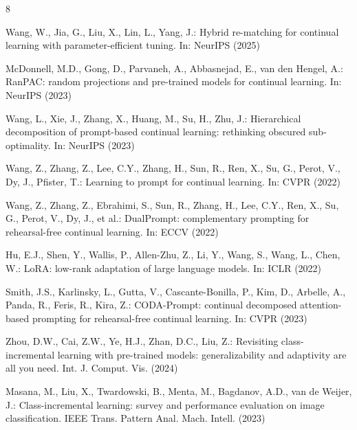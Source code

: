 \documentclass[runningheads]{llncs}
\begin{document}
\begin{thebibliography}{8}

Wang, W., Jia, G., Liu, X., Lin, L., Yang, J.: Hybrid re-matching for continual
learning with parameter-efficient tuning. In: NeurIPS (2025)

McDonnell, M.D., Gong, D., Parvaneh, A., Abbasnejad, E., van den Hengel, A.:
RanPAC: random projections and pre-trained models for continual learning. In:
NeurIPS (2023)

Wang, L., Xie, J., Zhang, X., Huang, M., Su, H., Zhu, J.: Hierarchical
decomposition of prompt-based continual learning: rethinking obscured
sub-optimality. In: NeurIPS (2023)

Wang, Z., Zhang, Z., Lee, C.Y., Zhang, H., Sun, R., Ren, X., Su, G., Perot, V.,
Dy, J., Pfister, T.: Learning to prompt for continual learning. In: CVPR (2022)

Wang, Z., Zhang, Z., Ebrahimi, S., Sun, R., Zhang, H., Lee, C.Y., Ren, X., Su,
G., Perot, V., Dy, J., et al.: DualPrompt: complementary prompting for
rehearsal-free continual learning. In: ECCV (2022)

Hu, E.J., Shen, Y., Wallis, P., Allen-Zhu, Z., Li, Y., Wang, S., Wang, L., Chen,
W.: LoRA: low-rank adaptation of large language models. In: ICLR (2022)

%

Smith, J.S., Karlinsky, L., Gutta, V., Cascante-Bonilla, P., Kim, D., Arbelle,
A., Panda, R., Feris, R., Kira, Z.: CODA-Prompt: continual decomposed
attention-based prompting for rehearsal-free continual learning. In: CVPR (2023)

Zhou, D.W., Cai, Z.W., Ye, H.J., Zhan, D.C., Liu, Z.: Revisiting
class-incremental learning with pre-trained models: generalizability and
adaptivity are all you need. Int. J. Comput. Vis. (2024)

Masana, M., Liu, X., Twardowski, B., Menta, M., Bagdanov, A.D., van de Weijer,
J.: Class-incremental learning: survey and performance evaluation on image
classification. IEEE Trans. Pattern Anal. Mach. Intell. (2023)


\end{thebibliography}
\end{document}
